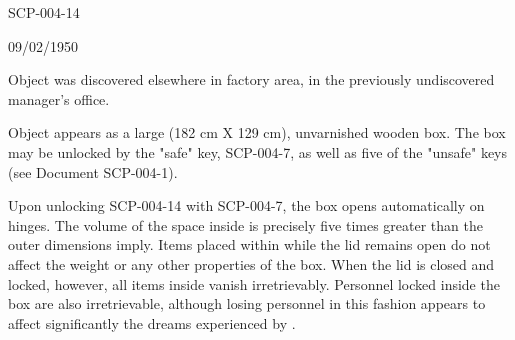 \begin{flushleft}
\end{flushleft}

 SCP-004-14

 09/02/1950

 Object was discovered elsewhere in factory area, in the previously undiscovered manager's office.

 Object appears as a large (182 cm X 129 cm), unvarnished wooden box. The box may be unlocked by the "safe" key, SCP-004-7, as well as five of the "unsafe" keys (see Document SCP-004-1).

Upon unlocking SCP-004-14 with SCP-004-7, the box opens automatically on hinges. The volume of the space inside is precisely five times greater than the outer dimensions imply. Items placed within while the lid remains open do not affect the weight or any other properties of the box. When the lid is closed and locked, however, all items inside vanish irretrievably. Personnel locked inside the box are also irretrievable, although losing personnel in this fashion appears to affect significantly the dreams experienced by \expunged.